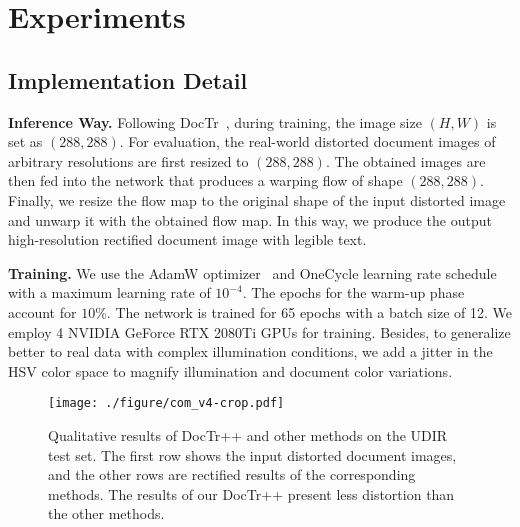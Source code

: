 \documentclass[lettersize,journal]{IEEEtran}
\begin{document}
\section{Experiments}
 
\subsection{Implementation Detail}
\textbf{Inference Way.}
Following DocTr~\cite{feng2021doctr}, during training, the image size $(H, W)$ is set as $(288, 288)$.
For evaluation, the real-world distorted document images of arbitrary resolutions are first resized to $(288, 288)$. The obtained images are then fed into the network that produces a warping flow of shape $(288, 288)$. Finally, we resize the flow map to the original shape of the input distorted image and unwarp it with the obtained flow map. In this way, we produce the output high-resolution rectified document image with legible text.


\smallskip
\textbf{Training.}
We use the AdamW optimizer~\cite{loshchilov2017decoupled} and OneCycle learning rate schedule~\cite{smith2019super} with a maximum learning rate of $10^{-4}$.
The epochs for the warm-up phase account for $10\%$.
The network is trained for 65 epochs with a batch size of 12.
We employ 4 NVIDIA GeForce RTX 2080Ti GPUs for training.
Besides, to generalize better to real data with complex illumination conditions, we add a jitter in the HSV color space to magnify illumination and document color variations. 

\begin{figure*}[t]
  \centering
  \texttt{[image: ./figure/com\_v4-crop.pdf]}
  \caption{Qualitative results of DocTr++ and other methods on the UDIR test set. The first row shows the input distorted document images, and the other rows are rectified results of the corresponding methods. The results of our DocTr++ present less distortion than the other methods.}
  \label{fig:qua_eva_udoc}
  \vspace{0.05in}
\end{figure*}
\end{document}
